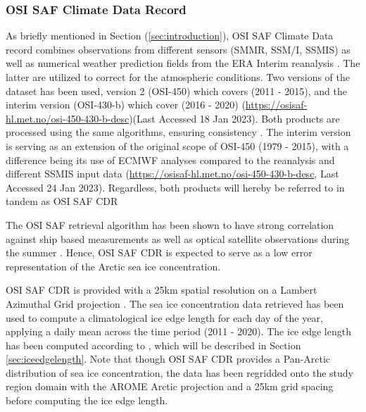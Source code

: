 \documentclass[../main/thesis.tex]{subfiles}
\begin{document}
\subsubsection{OSI SAF Climate Data Record}
\label{sec:osisafcdr}
As briefly mentioned in Section (\ref{sec:introduction}), OSI SAF Climate Data record combines observations from different sensors (SMMR, SSM/I, SSMIS) as well as numerical weather prediction fields from the ERA Interim reanalysis \citep{Dee2011}. The latter are utilized to correct for the atmospheric conditions. Two versions of the dataset has been used, version 2 (OSI-450) which covers (2011 - 2015), and the interim version (OSI-430-b) which cover (2016 - 2020) (\url{https://osisaf-hl.met.no/osi-450-430-b-desc})(Last Accessed 18 Jan 2023). Both products are processed using the same algorithms, ensuring consistency \citep{Lavergne2019a}. The interim version is serving as an extension of the original scope of OSI-450 (1979 - 2015), with a difference being its use of ECMWF analyses compared to the reanalysis and different SSMIS input data (\url{https://osisaf-hl.met.no/osi-450-430-b-desc}, Last Accessed 24 Jan 2023). Regardless, both products will hereby be referred to in tandem as OSI SAF CDR

The OSI SAF retrieval algorithm has been shown to have strong correlation against ship based measurements \citep{Kern2019} as well as optical satellite observations during the summer \citep{Kern2020}. Hence, OSI SAF CDR is expected to serve as a low error representation of the Arctic sea ice concentration.

OSI SAF CDR is provided with a 25km spatial resolution on a Lambert Azimuthal Grid projection \citep{Soerensen2021}. The sea ice concentration data retrieved has been used to compute a climatological ice edge length for each day of the year, applying a daily mean across the time period (2011 - 2020). The ice edge length has been computed according to \citet{Melsom2019}, which will be described in Section \ref{sec:iceedgelength}. Note that though OSI SAF CDR provides a Pan-Arctic distribution of sea ice concentration, the data has been regridded onto the study region domain with the AROME Arctic projection and a 25km grid spacing before computing the ice edge length.
\end{document}
